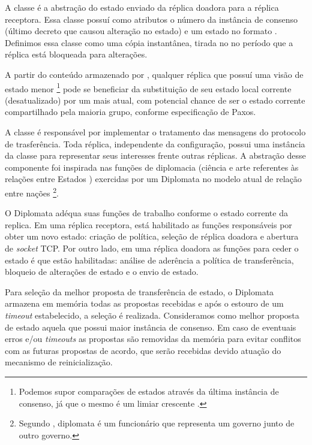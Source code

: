 
A classe  é a abstração do estado enviado da réplica doadora para
a réplica receptora. Essa classe possuí como atributos o número da instância de consenso
(último decreto que causou alteração no estado) e um estado no formato
. Definimos essa classe como uma cópia instantânea, tirada
no no período que a réplica está bloqueada para alterações.

A partir do conteúdo armazenado por , qualquer réplica que possuí
uma visão de estado menor \footnote{Podemos supor comparações de estados através da última
instância de consenso, já que o mesmo é um limiar crescente \cite{vieira-10b}.} pode se
beneficiar da substituição de seu estado local corrente (desatualizado) por um mais atual,
com potencial chance de ser o estado corrente compartilhado pela maioria grupo, conforme
especificação de Paxos.


A classe  é responsável por implementar o tratamento das mensagens do
protocolo de trasferência. Toda réplica, independente da configuração, possui uma
instância da classe  para representar seus interesses frente outras
réplicas. A abstração desse componente foi inspirada nas funções de diplomacia (ciência e
arte referentes às relações entre Estados \cite{aurelio}) exercidas por um Diplomata no
modelo atual de relação entre nações \footnote{Segundo , diplomata é
um funcionário que representa um governo junto de outro governo.}.

O Diplomata adéqua suas funções de trabalho conforme o estado corrente da replica. Em uma
réplica receptora, está habilitado as funções responsáveis por obter um novo estado:
criação de política, seleção de réplica doadora e abertura de \emph{socket} TCP. Por outro
lado, em uma réplica doadora as funções para ceder o estado é que estão habilitadas:
análise de aderência a política de transferência, bloqueio de alterações de estado e o
envio de estado.

Para seleção da melhor proposta de transferência de estado, o Diplomata armazena em
memória todas as propostas recebidas e após o estouro de um \emph{timeout} estabelecido, a
seleção é realizada. Consideramos como melhor proposta de estado aquela que possui maior
instância de consenso. Em caso de eventuais erros e/ou \emph{timeouts} as propostas são
removidas da memória para evitar conflitos com as futuras propostas de acordo, que serão
recebidas devido atuação do mecanismo de reinicialização.

